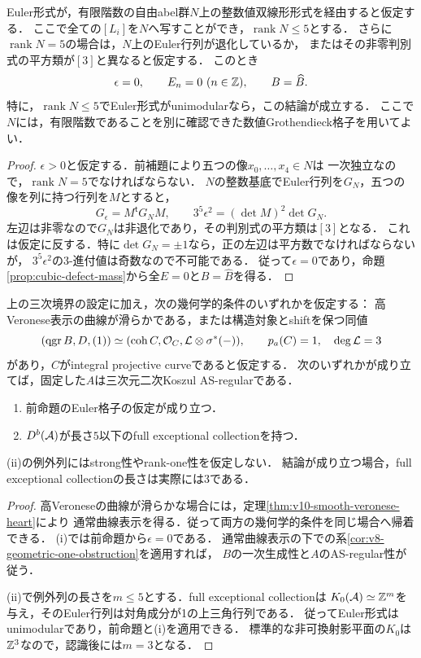 \documentclass[11pt,a4paper]{ltjsarticle}
\begin{document}
\begin{proposition}[数値格子の判別式による欠損消滅]
\label{prop:v10-unimodular-cubic-defect}
Euler形式が，有限階数の自由abel群$N$上の整数値双線形形式を経由すると仮定する．
ここで全ての$[L_i]$を$N$へ写すことができ，$\operatorname{rank}N\leq5$とする．
さらに$\operatorname{rank}N=5$の場合は，$N$上のEuler行列が退化しているか，
またはその非零判別式の平方類が$[3]$と異なると仮定する．
このとき
\[
 \epsilon=0,\qquad E_n=0\ (n\in\Z),\qquad B=\widehat B.
\]
特に，$\operatorname{rank}N\leq5$でEuler形式がunimodularなら，この結論が成立する．
ここで$N$には，有限階数であることを別に確認できた数値Grothendieck格子を用いてよい．
\end{proposition}
\begin{proof}
$\epsilon>0$と仮定する．前補題により五つの像$x_0,\ldots,x_4\in N$は
一次独立なので，$\operatorname{rank}N=5$でなければならない．
$N$の整数基底でEuler行列を$G_N$，五つの像を列に持つ行列を$M$とすると，
\[
 G_\epsilon=M^{\mathsf t}G_NM,
 \qquad
 3^5\epsilon^2=(\det M)^2\det G_N.
\]
左辺は非零なので$G_N$は非退化であり，その判別式の平方類は$[3]$となる．
これは仮定に反する．特に$\det G_N=\pm1$なら，正の左辺は平方数でなければならないが，
$3^5\epsilon^2$の$3$-進付値は奇数なので不可能である．
従って$\epsilon=0$であり，命題\ref{prop:cubic-defect-mass}から全$E=0$と$B=\widehat B$を得る．
\end{proof}

\begin{corollary}[滑らかな高Veroneseまたは幾何学的境界による認識]
\label{cor:v10-five-exceptionals-recognition}
上の三次境界の設定に加え，次の幾何学的条件のいずれかを仮定する：
高Veronese表示の曲線が滑らかである，または構造対象とshiftを保つ同値
\[
 (\operatorname{qgr} B,D,(1))\simeq
 (\operatorname{coh} C,\mathcal O_C,\mathcal L\otimes\sigma^*(-)),\qquad
 p_a(C)=1,\quad\deg\mathcal L=3
\]
があり，$C$がintegral projective curveであると仮定する．
次のいずれかが成り立てば，固定した$A$は三次元二次Koszul AS-regularである．
\begin{enumerate}[label=(\roman*)]
\item 前命題のEuler格子の仮定が成り立つ．
\item $D^b(\mathcal A)$が長さ$5$以下のfull exceptional collectionを持つ．
\end{enumerate}
(ii)の例外列にはstrong性やrank-one性を仮定しない．
結論が成り立つ場合，full exceptional collectionの長さは実際には$3$である．
\end{corollary}
\begin{proof}
高Veroneseの曲線が滑らかな場合には，定理\ref{thm:v10-smooth-veronese-heart}により
通常曲線表示を得る．従って両方の幾何学的条件を同じ場合へ帰着できる．
(i)では前命題から$\epsilon=0$である．
通常曲線表示の下での系\ref{cor:v8-geometric-one-obstruction}を適用すれば，
$B$の一次生成性と$A$のAS-regular性が従う．

(ii)で例外列の長さを$m\leq5$とする．full exceptional collectionは
$K_0(\mathcal A)\simeq\mathbb Z^m$を与え，そのEuler行列は対角成分が1の上三角行列である．
従ってEuler形式はunimodularであり，前命題と(i)を適用できる．
標準的な非可換射影平面の$K_0$は$\mathbb Z^3$なので，認識後には$m=3$となる．
\end{proof}
\end{document}
